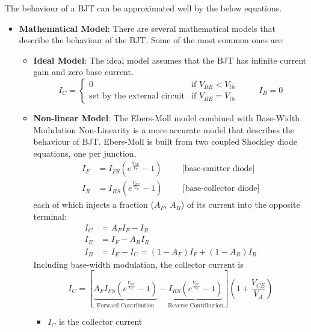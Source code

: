 The behaviour of a BJT can be approximated well by the below equations.
\begin{itemize}
  \item \textbf{Mathematical Model}:
    There are several mathematical models that describe the behaviour of the
    BJT. Some of the most common ones are:
    \begin{itemize}
      \item \textbf{Ideal Model}: The ideal model assumes that the BJT has infinite
        current gain and zero base current.
        \[
          I_C = \begin{cases}
            0 & \text{if } V_{BE} < V_{th} \\
            \text{set by the external circuit} & \text{if } V_{BE} = V_{th}
          \end{cases}
          \hspace{1cm} I_B = 0
        \]
      \item \textbf{Non-linear Model}: The Ebers-Moll model combined with Base-Width Modulation
        Non-Linearity is a more accurate model that describes the behaviour of BJT. Ebers-Moll
        is built from two coupled Shockley diode equations, one per junction,
        \begin{align*}
          I_F &= I_{FS}\left( e^{\frac{V_{BE}}{V_T}} - 1 \right) \hspace{1cm} \text{[base-emitter diode]} \\
          I_R &= I_{RS}\left( e^{\frac{V_{BC}}{V_T}} - 1 \right) \hspace{1cm} \text{[base-collector diode]}
        \end{align*}
        each of which injects a fraction (\(A_F\), \(A_R\)) of its current into the
        opposite terminal:
        \begin{align*}
          I_C &= A_F I_F - I_R \\
          I_E &= I_F - A_R I_R \\
          I_B &= I_E - I_C = (1 - A_F) I_F + (1 - A_R) I_R
        \end{align*}
        Including base-width modulation, the collector current is
        \[
          I_C = \left[\underbrace{A_F I_{FS} \left( e^{\frac{V_{BE}}{V_T}} - 1 \right)}_{\text{Forward Contribution}} - \underbrace{I_{RS} \left( e^{\frac{V_{BC}}{V_T}} - 1 \right)}_{\text{Reverse Contribution}}\right] \left( 1 + \frac{V_{CE}}{V_A} \right)
        \]
        \begin{itemize}
          \item \(I_C\) is the collector current

\end{itemize}
\end{itemize}
\end{itemize}
